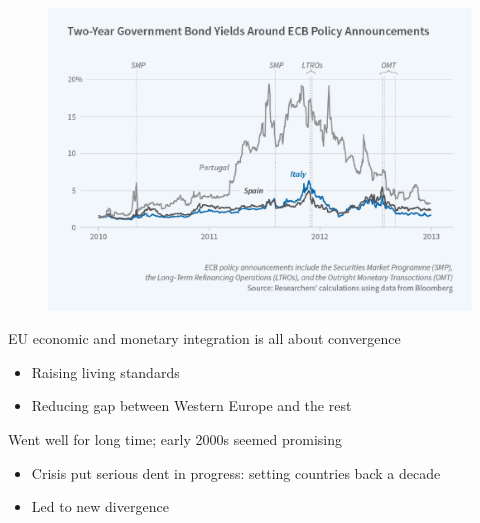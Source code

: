\documentclass{beamer}
\begin{document}
\begin{frame}
  \begin{figure}
    \includegraphics[scale=.4]{ecb.eps}
  \end{figure}
\end{frame}

\begin{frame} 
  EU economic and monetary integration is all about convergence
  \begin{itemize}
    \item Raising living standards
    \item Reducing gap between Western Europe and the rest
  \end{itemize}
  \medskip
  Went well for long time; early 2000s seemed promising
  \begin{itemize}
    \item Crisis put serious dent in progress: setting countries back a decade
    \item Led to new divergence
  \end{itemize}
\end{frame}
\end{document}
